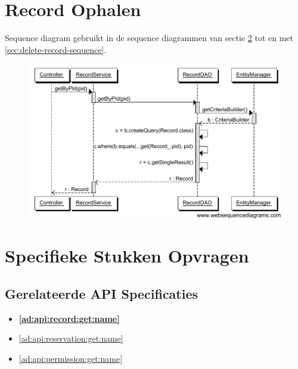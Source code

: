 \documentclass[a4paper,titlepage]{report}
\begin{document}
  \section{Record Ophalen}
    Sequence diagram gebruikt in de sequence diagrammen van sectie
    \ref{sec:get-record-sequence} tot en met \ref{sec:delete-record-sequence}.
    \begin{figure}[H]
      \label{fig:fetch-record-sequence}
      \centering
      \includegraphics[width=\textwidth,trim=0 0.4cm 0
      0,clip]{fetch_record_sequence.pdf}
    \end{figure}
    \pagebreak

  \section{Specifieke Stukken Opvragen}
    \label{sec:get-record-sequence}
    \subsection{Gerelateerde API Specificaties}
      \begin{itemize}
        \item \textbf{\ref{ad:api:record:get:name}}
        \item \ref{ad:api:reservation:get:name}
        \item \ref{ad:api:permission:get:name}
      \end{itemize}
\end{document}
